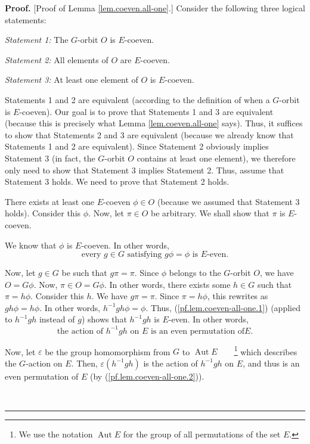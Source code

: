 \documentclass[numbers=enddot,12pt,final,onecolumn,notitlepage,abstracton]{scrartcl}%
\theoremstyle{definition}
\newenvironment{proof}[1][Proof]{\noindent\textbf{#1.} }{\ \rule{0.5em}{0.5em}}
\begin{document}
\begin{proof}
[Proof of Lemma \ref{lem.coeven.all-one}.] Consider the following three
logical statements:

\textit{Statement 1:} The $G$-orbit $O$ is $E$-coeven.

\textit{Statement 2:} All elements of $O$ are $E$-coeven.

\textit{Statement 3:} At least one element of $O$ is $E$-coeven.

Statements 1 and 2 are equivalent (according to the definition of
when a $G$-orbit is $E$-coeven).
Our goal is to prove that Statements 1 and 3 are
equivalent (because this is precisely what Lemma \ref{lem.coeven.all-one}
says). Thus, it suffices to show that Statements 2 and 3 are
equivalent (because we already know that Statements 1 and 2 are
equivalent). Since Statement 2 obviously implies Statement 3 (in fact,
the $G$-orbit $O$ contains at least one element), we therefore only
need to show that Statement 3 implies Statement 2. Thus, assume that Statement
3 holds. We need to prove that Statement 2 holds.

There exists at least one $E$-coeven $\phi\in O$ (because we assumed that
Statement 3 holds). Consider this $\phi$. Now, let $\pi\in O$ be arbitrary. We
shall show that $\pi$ is $E$-coeven.

We know that $\phi$ is $E$-coeven. In other words,
\begin{equation}
\text{every }g\in G\text{ satisfying }g\phi=\phi\text{ is }E\text{-even.}%
\label{pf.lem.coeven-all-one.1}%
\end{equation}


Now, let $g\in G$ be such that $g\pi=\pi$. Since $\phi$ belongs to the
$G$-orbit $O$, we have $O=G\phi$. Now, $\pi\in O=G\phi$. In other words, there
exists some $h\in G$ such that $\pi=h\phi$. Consider this $h$. We have
$g\pi=\pi$. Since $\pi=h\phi$, this rewrites as $gh\phi=h\phi$. In other
words, $h^{-1}gh\phi=\phi$. Thus, (\ref{pf.lem.coeven-all-one.1}) (applied to
$h^{-1}gh$ instead of $g$) shows that $h^{-1}gh$ is $E$-even. In other words,%
\begin{equation}
\text{the action of }h^{-1}gh\text{ on }E\text{ is an even permutation of
}E\text{.}\label{pf.lem.coeven-all-one.2}%
\end{equation}


Now, let $\varepsilon$ be the group homomorphism from $G$ to
$\operatorname{Aut}E$\ \ \ \ \footnote{We use the notation
$\operatorname{Aut}E$ for the group of all permutations
of the set $E$.} which describes the $G$-action on $E$. Then,
$\varepsilon\left(  h^{-1}gh\right)  $ is the action of $h^{-1}gh$ on $E$, and
thus is an even permutation of $E$ (by (\ref{pf.lem.coeven-all-one.2})).


\end{proof}
\end{document}
